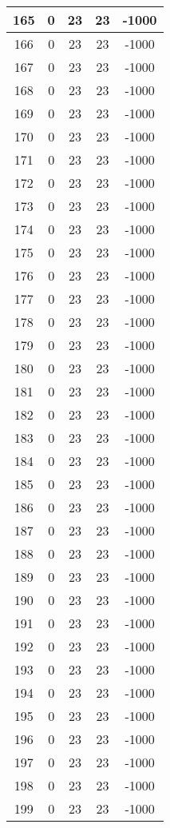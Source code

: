 \documentclass[letterpaper, 12pt]{article}
\begin{document}
\begin{longtable}{|c|c|c|c|c|}
\hline
165 & 0 & 23 & 23 & -1000 \\
\hline
166 & 0 & 23 & 23 & -1000 \\
\hline
167 & 0 & 23 & 23 & -1000 \\
\hline
168 & 0 & 23 & 23 & -1000 \\
\hline
169 & 0 & 23 & 23 & -1000 \\
\hline
170 & 0 & 23 & 23 & -1000 \\
\hline
171 & 0 & 23 & 23 & -1000 \\
\hline
172 & 0 & 23 & 23 & -1000 \\
\hline
173 & 0 & 23 & 23 & -1000 \\
\hline
174 & 0 & 23 & 23 & -1000 \\
\hline
175 & 0 & 23 & 23 & -1000 \\
\hline
176 & 0 & 23 & 23 & -1000 \\
\hline
177 & 0 & 23 & 23 & -1000 \\
\hline
178 & 0 & 23 & 23 & -1000 \\
\hline
179 & 0 & 23 & 23 & -1000 \\
\hline
180 & 0 & 23 & 23 & -1000 \\
\hline
181 & 0 & 23 & 23 & -1000 \\
\hline
182 & 0 & 23 & 23 & -1000 \\
\hline
183 & 0 & 23 & 23 & -1000 \\
\hline
184 & 0 & 23 & 23 & -1000 \\
\hline
185 & 0 & 23 & 23 & -1000 \\
\hline
186 & 0 & 23 & 23 & -1000 \\
\hline
187 & 0 & 23 & 23 & -1000 \\
\hline
188 & 0 & 23 & 23 & -1000 \\
\hline
189 & 0 & 23 & 23 & -1000 \\
\hline
190 & 0 & 23 & 23 & -1000 \\
\hline
191 & 0 & 23 & 23 & -1000 \\
\hline
192 & 0 & 23 & 23 & -1000 \\
\hline
193 & 0 & 23 & 23 & -1000 \\
\hline
194 & 0 & 23 & 23 & -1000 \\
\hline
195 & 0 & 23 & 23 & -1000 \\
\hline
196 & 0 & 23 & 23 & -1000 \\
\hline
197 & 0 & 23 & 23 & -1000 \\
\hline
198 & 0 & 23 & 23 & -1000 \\
\hline
199 & 0 & 23 & 23 & -1000 \\
\hline
\end{longtable}
\end{document}
